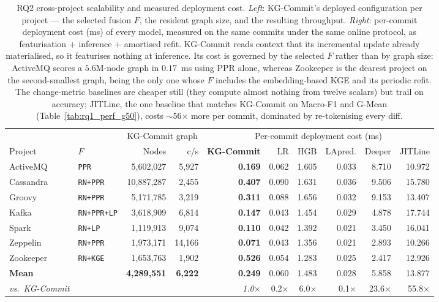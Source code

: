 \documentclass[final,5p,times,twocolumn]{elsarticle}
\theoremstyle{plain}
\begin{document}
\begin{table}[t]\centering\small\setlength{\tabcolsep}{4pt}
\caption{RQ2 cross-project scalability and measured deployment cost. \emph{Left}: KG-Commit's deployed configuration per project --- the selected fusion $F$, the resident graph size, and the resulting throughput. \emph{Right}: per-commit deployment cost (ms) of every model, measured on the same commits under the same online protocol, as featurisation $+$ inference $+$ amortised refit. KG-Commit reads context that its incremental update already materialised, so it featurises nothing at inference. Its cost is governed by the selected $F$ rather than by graph size: ActiveMQ scores a $5.6$M-node graph in $0.17$~ms using PPR alone, whereas Zookeeper is the dearest project on the second-smallest graph, being the only one whose $F$ includes the embedding-based KGE and its periodic refit. The change-metric baselines are cheaper still (they compute almost nothing from twelve scalars) but trail on accuracy; JITLine, the one baseline that matches KG-Commit on Macro-F1 and G-Mean (Table~\ref{tab:rq1_perf_g50}), costs $\sim$56$\times$ more per commit, dominated by re-tokenising every diff.}
\label{tab:crossproject_scalability}
\begin{tabular}{ll rr | rrrrrr}
\toprule
& & \multicolumn{2}{c|}{KG-Commit graph} & \multicolumn{6}{c}{Per-commit deployment cost (ms)} \\
\cmidrule(lr){3-4}\cmidrule(l){5-10}
Project & $F$ & Nodes & c/s & \textbf{KG-Commit} & LR & HGB & LApred. & Deeper & JITLine \\
\midrule
ActiveMQ & \texttt{\scriptsize PPR} & 5,602,027 & 5,927 & \textbf{0.169} & 0.062 & 1.605 & 0.033 & 8.710 & 10.972 \\
Cassandra & \texttt{\scriptsize RN+PPR} & 10,887,287 & 2,455 & \textbf{0.407} & 0.090 & 1.631 & 0.036 & 9.506 & 15.780 \\
Groovy & \texttt{\scriptsize RN+PPR} & 5,171,785 & 3,219 & \textbf{0.311} & 0.088 & 1.656 & 0.032 & 9.153 & 13.407 \\
Kafka & \texttt{\scriptsize RN+PPR+LP} & 3,618,909 & 6,814 & \textbf{0.147} & 0.043 & 1.454 & 0.029 & 4.878 & 17.744 \\
Spark & \texttt{\scriptsize RN+LP} & 1,119,913 & 9,074 & \textbf{0.110} & 0.042 & 1.392 & 0.021 & 3.450 & 16.041 \\
Zeppelin & \texttt{\scriptsize RN+PPR} & 1,973,171 & 14,166 & \textbf{0.071} & 0.043 & 1.356 & 0.021 & 2.893 & 10.266 \\
Zookeeper & \texttt{\scriptsize RN+KGE} & 1,653,763 & 1,902 & \textbf{0.526} & 0.054 & 1.283 & 0.025 & 2.417 & 12.926 \\
\midrule \textbf{Mean} & & \textbf{4,289,551} & \textbf{6,222} & \textbf{0.249} & 0.060 & 1.483 & 0.028 & 5.858 & 13.877 \\
\textit{vs.\ KG-Commit} & & & & \textit{1.0$\times$} & 0.2$\times$ & 6.0$\times$ & 0.1$\times$ & 23.6$\times$ & 55.8$\times$ \\
\bottomrule
\end{tabular}
\end{table}
\end{document}
